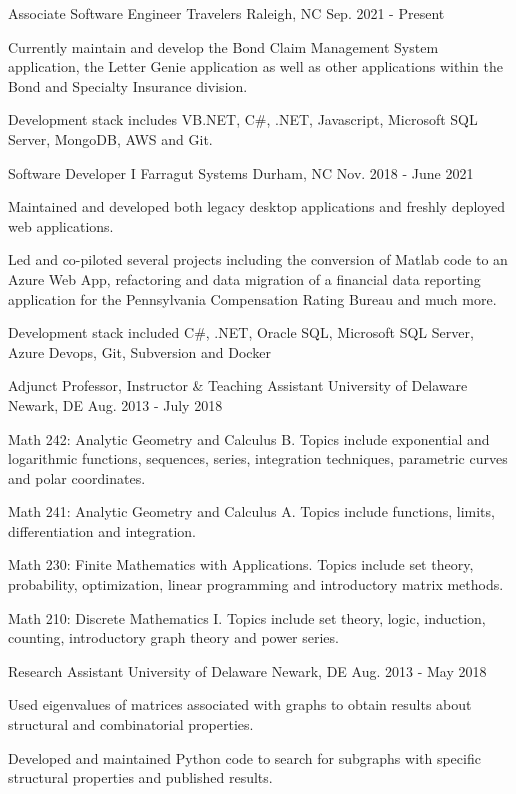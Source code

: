 \begin{cventries}
  \cventry
    {Associate Software Engineer}
    {Travelers}
    {Raleigh, NC}
    {Sep. 2021 - Present}
    {
      \begin{cvitems}
        \item {Currently maintain and develop the Bond Claim Management System application, the Letter Genie application as well as other applications within the Bond and Specialty Insurance division.}
        \item {Development stack includes VB.NET, C\#, .NET, Javascript, Microsoft SQL Server, MongoDB, AWS and Git.}
      \end{cvitems}
    }
  \cventry
    {Software Developer I}
    {Farragut Systems}
    {Durham, NC}
    {Nov. 2018 - June 2021}
    {
      \begin{cvitems}
        \item {Maintained and developed both legacy desktop applications and freshly deployed web applications.}
        \item {Led and co-piloted several projects including the conversion of Matlab code to an Azure Web App, refactoring and data migration of a financial data reporting application for the Pennsylvania Compensation Rating Bureau and much more.}
        \item {Development stack included C\#, .NET, Oracle SQL, Microsoft SQL Server, Azure Devops, Git, Subversion and Docker}
      \end{cvitems}
    }
  \cventry
    {Adjunct Professor, Instructor \& Teaching Assistant}
    {University of Delaware}
    {Newark, DE}
    {Aug. 2013 - July 2018}
    {
      \begin{cvitems}
        \item {Math 242: Analytic Geometry and Calculus B. Topics include exponential and logarithmic functions, sequences, series, integration techniques, parametric curves and polar coordinates.}
        \item {Math 241: Analytic Geometry and Calculus A. Topics include functions, limits, differentiation and integration.}
        \item {Math 230: Finite Mathematics with Applications. Topics include set theory, probability, optimization, linear programming and introductory matrix methods.}
        \item {Math 210: Discrete Mathematics I. Topics include set theory, logic, induction, counting, introductory graph theory and power series.}
      \end{cvitems}
    }
  \cventry
    {Research Assistant}
    {University of Delaware}
    {Newark, DE}
    {Aug. 2013 - May 2018}
    {
      \begin{cvitems}
        \item {Used eigenvalues of matrices associated with graphs to obtain results about structural and combinatorial properties.}
        \item{Developed and maintained Python code to search for subgraphs with specific structural properties and published results.}
      \end{cvitems}
    }
\end{cventries}
\vspace*{-2pt}

